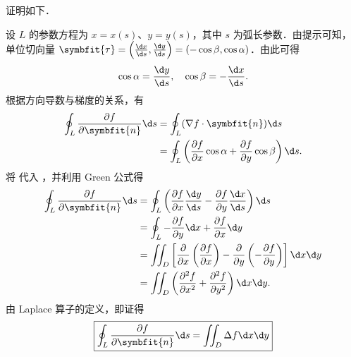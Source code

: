 \begin{myproof}
     证明如下．

    设 $L$ 的参数方程为 $x = x(s)$、$y = y(s)$，其中 $s$ 为弧长参数．由提示可知，单位切向量 $\symbfit{\tau} = \left( \frac{\d x}{\d s}, \frac{\d y}{\d s} \right) = (-\cos \beta, \cos \alpha)$．由此可得
    \begin{equation}\label{eq:normal-relation}
        \cos \alpha = \frac{\d y}{\d s}, \quad \cos \beta = -\frac{\d x}{\d s}.
    \end{equation}
    根据方向导数与梯度的关系，有
    \begin{equation}\label{eq:directional-derivative}
        \begin{aligned}
            \oint_{L} \frac{\partial f}{\partial \symbfit{n}} \d s & = \oint_{L} (\nabla f \cdot \symbfit{n}) \d s                                                                         \\
                                                                   & = \oint_{L} \left( \frac{\partial f}{\partial x} \cos \alpha + \frac{\partial f}{\partial y} \cos \beta \right) \d s.
        \end{aligned}
    \end{equation}
    将  代入 ，并利用 Green 公式得
    \begin{equation}
        \begin{aligned}
            \oint_{L} \frac{\partial f}{\partial \symbfit{n}} \d s & = \oint_{L} \left( \frac{\partial f}{\partial x} \frac{\d y}{\d s} - \frac{\partial f}{\partial y} \frac{\d x}{\d s} \right) \d s                                                         \\
                                                                   & = \oint_{L} -\frac{\partial f}{\partial y} \d x + \frac{\partial f}{\partial x} \d y                                                                                                      \\
                                                                   & = \iint_{D} \left[ \frac{\partial}{\partial x} \left( \frac{\partial f}{\partial x} \right) - \frac{\partial}{\partial y} \left( -\frac{\partial f}{\partial y} \right) \right] \d x \d y \\
                                                                   & = \iint_{D} \left( \frac{\partial^2 f}{\partial x^2} + \frac{\partial^2 f}{\partial y^2} \right) \d x \d y.
        \end{aligned}
    \end{equation}
    由 Laplace 算子的定义，即证得
    \begin{equation}
        \boxed{\oint_{L} \frac{\partial f}{\partial \symbfit{n}} \d s = \iint_{D} \Delta f \d x \d y}
    \end{equation}


\end{myproof}
